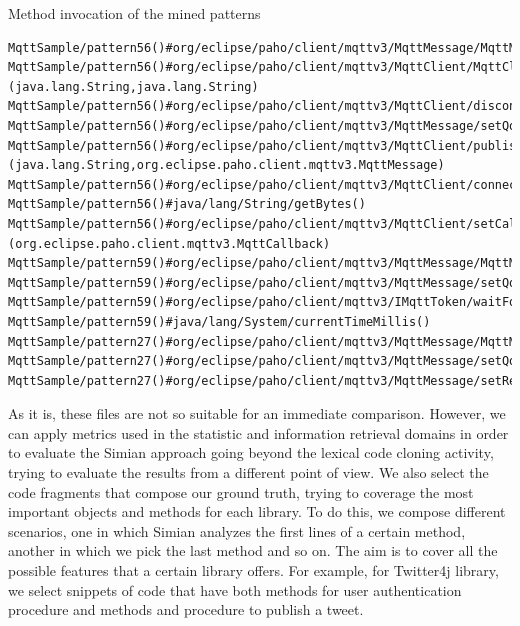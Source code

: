 \vspace{5mm}
\noindent
Method invocation of the mined patterns
\begin{lstlisting}
MqttSample/pattern56()#org/eclipse/paho/client/mqttv3/MqttMessage/MqttMessage(byte[])
MqttSample/pattern56()#org/eclipse/paho/client/mqttv3/MqttClient/MqttClient
(java.lang.String,java.lang.String)
MqttSample/pattern56()#org/eclipse/paho/client/mqttv3/MqttClient/disconnect()
MqttSample/pattern56()#org/eclipse/paho/client/mqttv3/MqttMessage/setQos(int)
MqttSample/pattern56()#org/eclipse/paho/client/mqttv3/MqttClient/publish
(java.lang.String,org.eclipse.paho.client.mqttv3.MqttMessage)
MqttSample/pattern56()#org/eclipse/paho/client/mqttv3/MqttClient/connect()
MqttSample/pattern56()#java/lang/String/getBytes()
MqttSample/pattern56()#org/eclipse/paho/client/mqttv3/MqttClient/setCallback
(org.eclipse.paho.client.mqttv3.MqttCallback)
MqttSample/pattern59()#org/eclipse/paho/client/mqttv3/MqttMessage/MqttMessage(byte[])
MqttSample/pattern59()#org/eclipse/paho/client/mqttv3/MqttMessage/setQos(int)
MqttSample/pattern59()#org/eclipse/paho/client/mqttv3/IMqttToken/waitForCompletion()
MqttSample/pattern59()#java/lang/System/currentTimeMillis()
MqttSample/pattern27()#org/eclipse/paho/client/mqttv3/MqttMessage/MqttMessage(byte[])
MqttSample/pattern27()#org/eclipse/paho/client/mqttv3/MqttMessage/setQos(int)
MqttSample/pattern27()#org/eclipse/paho/client/mqttv3/MqttMessage/setRetained(boolean)

\end{lstlisting}
As it is, these files are not so suitable for an immediate comparison. However, we can apply metrics used in the statistic and information retrieval domains in order to evaluate the Simian approach going beyond the lexical code cloning activity, trying to evaluate the results from a different point of view.
We also select the code fragments that compose our ground truth, trying to coverage the most important objects and methods for each library. To do this, we compose different scenarios, one in which Simian analyzes the first lines of a certain method, another in which we pick the last method and so on. The aim is to cover all the possible features that a certain library offers. For example, for Twitter4j library, we select snippets of code that have both methods for user authentication procedure and methods and procedure to publish a tweet.
